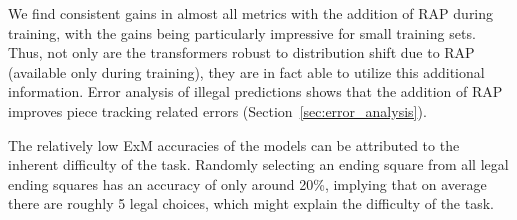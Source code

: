 \documentclass[12pt]{thesis-umich}[thesis]
\begin{document}
We find consistent gains in almost all metrics with the addition of RAP during training, with the gains being particularly impressive for small training sets. Thus, not only are the transformers robust to distribution shift due to RAP (available only during training), they are in fact able to utilize this additional information. Error analysis of illegal predictions shows that the addition of RAP improves piece tracking related errors (Section~\ref{sec:error_analysis}).  

The relatively low ExM accuracies of the models can be attributed to the inherent difficulty of the task.   
Randomly selecting an ending square from all legal ending squares 
has an accuracy of only around 20\%, implying that on average there are roughly 5 legal choices, which might explain the difficulty of the task.  
\end{document}
